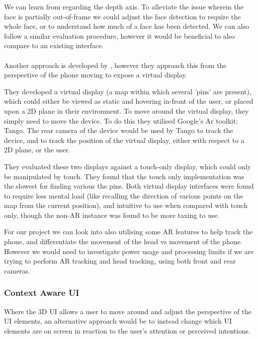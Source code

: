 We can learn from \citeauthor{francone2011using} regarding the depth axis. To alleviate the issue wherein the face is partially out-of-frame we could adjust the face detection to require the whole face, or to understand how much of a face has been detected.
We can also follow a similar evaluation procedure, however it would be beneficial to also compare to an existing interface.
\\\\
Another approach is developed by \citeauthor{miyazaki2021ar}, however they approach this from the perspective of the phone moving to expose a virtual display\cite{miyazaki2021ar}.

They developed a virtual display (a map within which several 'pins' are present), which could either be viewed as static and hovering in-front of the user, or placed upon a 2D plane in their environment.
To move around the virtual display, they simply need to move the device.
To do this they utilised Google's Ar toolkit: Tango. The rear camera of the device would be used by Tango to track the device, and to track the position of the virtual display, either with respect to a 2D plane, or the user.

They evaluated these two displays against a touch-only display, which could only be manipulated by touch.
They found that the touch only implementation was the slowest for finding various the pins.
Both virtual display interfaces were found to require less mental load (like recalling the direction of various points on the map from the current position), and intuitive to use when compared with touch only, though the non-AR instance was found to be more taxing to use.

For our project we can look into also utilising some AR features to help track the phone, and differentiate the movement of the head vs movement of the phone.
However we would need to investigate power usage and processing limits if we are trying to perform AR tracking and head tracking, using both front and rear cameras.

\subsubsection{Context Aware UI}

Where the 3D UI allows a user to move around and adjust the perspective of the UI elements, an alternative approach would be to instead change which UI elements are on screen in reaction to the user's attention or perceived intentions.

